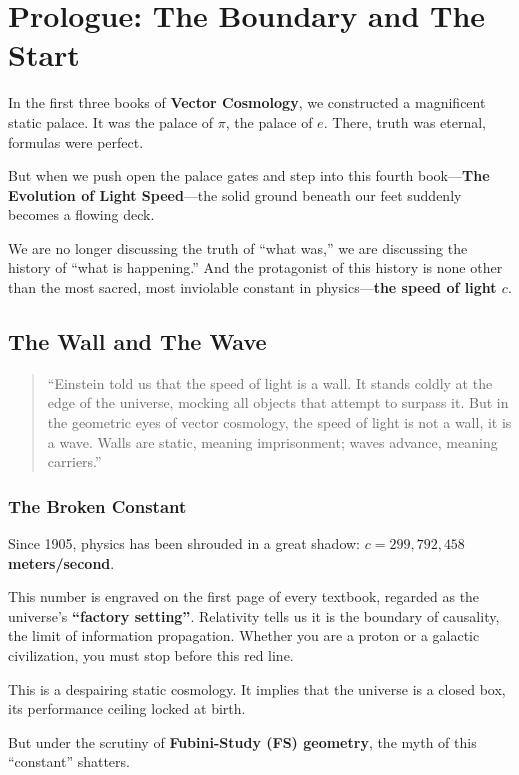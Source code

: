 \section{Prologue: The Boundary and The Start}

In the first three books of \textbf{Vector Cosmology}, we constructed a magnificent static palace. It was the palace of $\pi$, the palace of $e$. There, truth was eternal, formulas were perfect.

But when we push open the palace gates and step into this fourth book---\textbf{The Evolution of Light Speed}---the solid ground beneath our feet suddenly becomes a flowing deck.

We are no longer discussing the truth of ``what was,'' we are discussing the history of ``what is happening.'' And the protagonist of this history is none other than the most sacred, most inviolable constant in physics---\textbf{the speed of light $c$}.

\subsection{The Wall and The Wave}

\begin{quote}
``Einstein told us that the speed of light is a wall. It stands coldly at the edge of the universe, mocking all objects that attempt to surpass it. But in the geometric eyes of vector cosmology, the speed of light is not a wall, it is a wave. Walls are static, meaning imprisonment; waves advance, meaning carriers.''
\end{quote}

\subsubsection{The Broken Constant}

Since 1905, physics has been shrouded in a great shadow: \textbf{$c = 299,792,458$ meters/second}.

This number is engraved on the first page of every textbook, regarded as the universe's \textbf{``factory setting''}. Relativity tells us it is the boundary of causality, the limit of information propagation. Whether you are a proton or a galactic civilization, you must stop before this red line.

This is a despairing static cosmology. It implies that the universe is a closed box, its performance ceiling locked at birth.

But under the scrutiny of \textbf{Fubini-Study (FS) geometry}, the myth of this ``constant'' shatters.

